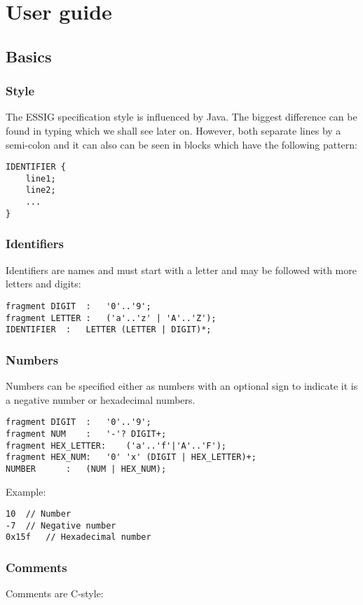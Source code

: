 \chapter{User guide}
\section{Basics}
\subsection{Style}
The \ac{ESSIG} specification style is influenced by Java. The biggest
difference can be found in typing which we shall see later on. However, both
separate lines by a semi-colon and it can also can be seen in blocks which have
the following pattern:

\begin{verbatim}
IDENTIFIER {
	line1;
	line2;
	...
}
\end{verbatim}


\subsection[IDENTIFIER]{Identifiers}
Identifiers are names and must start with a letter and may be followed with
more letters and digits:

\begin{verbatim}
fragment DIGIT	:	'0'..'9';
fragment LETTER	:	('a'..'z' | 'A'..'Z');
IDENTIFIER	:	LETTER (LETTER | DIGIT)*;
\end{verbatim}

\subsection{Numbers}
Numbers can be specified either as numbers with an optional sign to indicate it
is a negative number or hexadecimal numbers.

\begin{verbatim}
fragment DIGIT	:	'0'..'9';
fragment NUM	:	'-'? DIGIT+;
fragment HEX_LETTER:	('a'..'f'|'A'..'F');
fragment HEX_NUM:	'0' 'x' (DIGIT | HEX_LETTER)+;
NUMBER		:	(NUM | HEX_NUM);
\end{verbatim}

Example:
\begin{verbatim}
10	// Number
-7	// Negative number
0x15f	// Hexadecimal number
\end{verbatim}

\subsection{Comments}
Comments are C-style:

